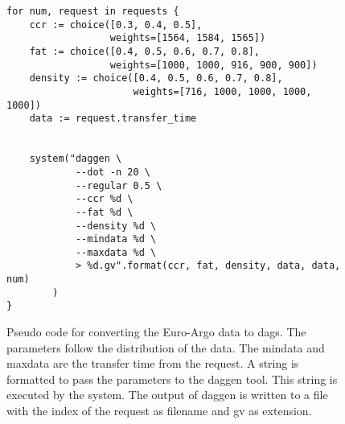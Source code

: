 \begin{figure}[htp!]
    \centering
\begin{Verbatim}[frame=single]
for num, request in requests {
    ccr := choice([0.3, 0.4, 0.5],
                  weights=[1564, 1584, 1565])
    fat := choice([0.4, 0.5, 0.6, 0.7, 0.8],
                  weights=[1000, 1000, 916, 900, 900])
    density := choice([0.4, 0.5, 0.6, 0.7, 0.8],
                      weights=[716, 1000, 1000, 1000, 1000])
    data := request.transfer_time


    system("daggen \
            --dot -n 20 \
            --regular 0.5 \
            --ccr %d \
            --fat %d \
            --density %d \
            --mindata %d \
            --maxdata %d \
            > %d.gv".format(ccr, fat, density, data, data, num)
        )
}
\end{Verbatim}
    \caption{Pseudo code for converting the Euro-Argo data to \glspl{dag}. The
    parameters follow the distribution of the \mrlco data. The mindata and
    maxdata are the transfer time from the request. A string is
    formatted to pass the parameters to the daggen tool. This string is
    executed by the system. The output of daggen is written to a file with the
    index of the request as filename and gv as extension.}
    \label{fig:pseudo}
\end{figure}
